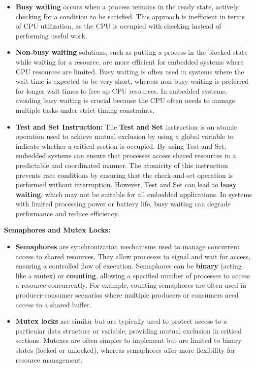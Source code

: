 \documentclass[
  14pt,
  a4paper,
  numbers=noendperiod,
  headinclude=true,
  footinclude=true,
  DIV=calc]{scrreprt}
\begin{document}
\begin{itemize}
\item
  \textbf{Busy waiting} occurs when a process remains in the ready
  state, actively checking for a condition to be satisfied. This
  approach is inefficient in terms of CPU utilization, as the CPU is
  occupied with checking instead of performing useful work.
\item
  \textbf{Non-busy waiting} solutions, such as putting a process in the
  blocked state while waiting for a resource, are more efficient for
  embedded systems where CPU resources are limited. Busy waiting is
  often used in systems where the wait time is expected to be very
  short, whereas non-busy waiting is preferred for longer wait times to
  free up CPU resources. In embedded systems, avoiding busy waiting is
  crucial because the CPU often needs to manage multiple tasks under
  strict timing constraints.
\item
  \textbf{Test and Set Instruction:} The \textbf{Test and Set}
  instruction is an atomic operation used to achieve mutual exclusion by
  using a global variable to indicate whether a critical section is
  occupied. By using Test and Set, embedded systems can ensure that
  processes access shared resources in a predictable and coordinated
  manner. The atomicity of this instruction prevents race conditions by
  ensuring that the check-and-set operation is performed without
  interruption. However, Test and Set can lead to \textbf{busy waiting},
  which may not be suitable for all embedded applications. In systems
  with limited processing power or battery life, busy waiting can
  degrade performance and reduce efficiency.
\end{itemize}

\textbf{Semaphores and Mutex Locks:}

\begin{itemize}
\item
  \textbf{Semaphores} are synchronization mechanisms used to manage
  concurrent access to shared resources. They allow processes to signal
  and wait for access, ensuring a controlled flow of execution.
  Semaphores can be \textbf{binary} (acting like a mutex) or
  \textbf{counting}, allowing a specified number of processes to access
  a resource concurrently. For example, counting semaphores are often
  used in producer-consumer scenarios where multiple producers or
  consumers need access to a shared buffer.
\item
  \textbf{Mutex locks} are similar but are typically used to protect
  access to a particular data structure or variable, providing mutual
  exclusion in critical sections. Mutexes are often simpler to implement
  but are limited to binary states (locked or unlocked), whereas
  semaphores offer more flexibility for resource management.
\end{itemize}
\end{document}
